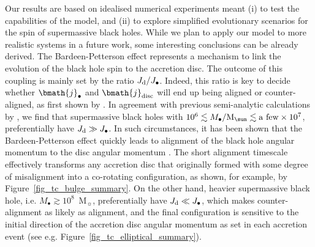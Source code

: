 \documentclass[a4paper,fleqn,usenatbib]{mnras}
\begin{document}
Our results are based on idealised numerical experiments meant (i) to test the capabilities of the model, and (ii) to explore simplified evolutionary scenarios for the spin of supermassive black holes.
While we plan to apply our model to more realistic systems in a future work, some interesting conclusions can be already derived. 
The Bardeen-Petterson effect represents a mechanism to link the evolution of the black hole spin to the accretion disc. 
The outcome of this coupling is mainly set by the ratio $J_{\rm d} / J_{\bullet}$.
Indeed, this ratio is key to decide whether $\bmath{j}_{\bullet}$ and $\bmath{j}_{\rm disc}$ will end up being aligned or counter-aligned, as first shown by \citet{king+05}.
In agreement with previous semi-analytic calculations by \citet{dotti+13}, we find that supermassive black holes with $10^{6} \lesssim M_{\bullet}/{\rm M}_{\sun} \lesssim {\rm a~few} \times 10^{7}$, preferentially have $J_{\rm d} \gg J_{\bullet}$.
In such circumstances, it has been shown that the Bardeen-Petterson effect quickly leads to alignment of the black hole angular momentum to the disc angular momentum \citep{lodato+06, martin+07, perego+09}.
The short alignment timescale effectively transforms any accretion disc that originally formed with some degree of misalignment into a co-rotating configuration, as shown, for example, by Figure~\ref{fig_tc_bulge_summary}.
On the other hand, heavier supermassive black hole, i.e. $M_{\bullet} \gtrsim 10^{8}$~M$_{\sun}$, preferentially have $J_{\rm d} \ll J_{\bullet}$, which makes counter-alignment as likely as alignment, and the final configuration is sensitive to the initial direction of the accretion disc angular momentum as set in each accretion event (see e.g. Figure~\ref{fig_tc_elliptical_summary}).
\end{document}
